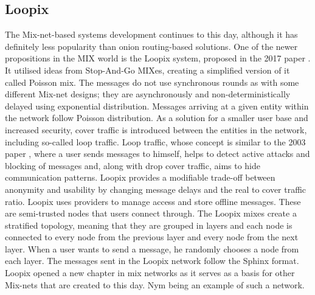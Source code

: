 \subsection{Loopix}
The Mix-net-based systems development continues to this day, although it has definitely less popularity than onion routing-based solutions. One of the newer propositions in the MIX world is the Loopix system, proposed in the 2017 paper \cite{loopix}. It utilised ideas from Stop-And-Go MIXes, creating a simplified version of it called Poisson mix. The messages do not use synchronous rounds as with some different Mix-net designs; they are asynchronously and non-deterministically delayed using exponential distribution. Messages arriving at a given entity within the network follow Poisson distribution. As a solution for a smaller user base and increased security, cover traffic is introduced between the entities in the network, including so-called loop traffic. Loop traffic, whose concept is similar to the 2003 paper \cite{n-1}, where a user sends messages to himself, helps to detect active attacks and blocking of messages and, along with drop cover traffic, aims to hide communication patterns. Loopix provides a modifiable trade-off between anonymity and usability by changing message delays and the real to cover traffic ratio. Loopix uses providers to manage access and store offline messages. These are semi-trusted nodes that users connect through. The Loopix mixes create a stratified topology, meaning that they are grouped in layers and each node is connected to every node from the previous layer and every node from the next layer. When a user wants to send a message, he randomly chooses a node from each layer. The messages sent in the Loopix network follow the Sphinx format.
Loopix opened a new chapter in mix networks as it serves as a basis for other Mix-nets that are created to this day. 
Nym \cite{nym} being an example of such a network.

